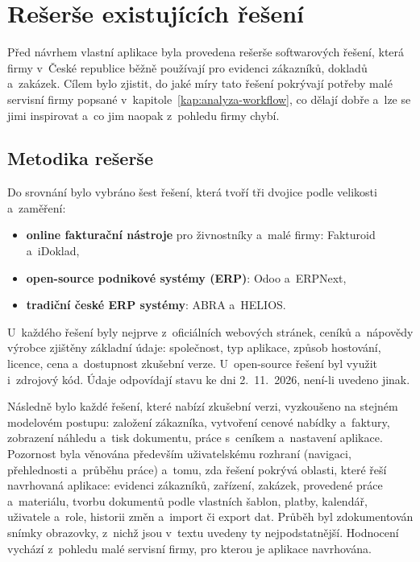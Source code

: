 \chapter{Rešerše existujících řešení}\label{kap:reserse}

Před návrhem vlastní aplikace byla provedena rešerše softwarových řešení, která firmy v~České republice běžně používají pro evidenci zákazníků, dokladů a~zakázek. Cílem bylo zjistit, do jaké míry tato řešení pokrývají potřeby malé servisní firmy popsané v~kapitole~\ref{kap:analyza-workflow}, co dělají dobře a~lze se jimi inspirovat a~co jim naopak z~pohledu firmy chybí.

\section{Metodika rešerše}\label{sec:reserse-metodika}

Do srovnání bylo vybráno šest řešení, která tvoří tři dvojice podle velikosti a~zaměření:
\begin{itemize}
\item \textbf{online fakturační nástroje} pro živnostníky a~malé firmy: Fakturoid a~iDoklad,
\item \textbf{open-source podnikové systémy (ERP)}: Odoo a~ERPNext,
\item \textbf{tradiční české ERP systémy}: ABRA a~HELIOS.
\end{itemize}

U~každého řešení byly nejprve z~oficiálních webových stránek, ceníků a~nápovědy výrobce zjištěny základní údaje: společnost, typ aplikace, způsob hostování, licence, cena a~dostupnost zkušební verze. U~open-source řešení byl využit i~zdrojový kód. Údaje odpovídají stavu ke dni 2.~11.~2026, není-li uvedeno jinak.

Následně bylo každé řešení, které nabízí zkušební verzi, vyzkoušeno na stejném modelovém postupu: založení zákazníka, vytvoření cenové nabídky a~faktury, zobrazení náhledu a~tisk dokumentu, práce s~ceníkem a~nastavení aplikace. Pozornost byla věnována především uživatelskému rozhraní (navigaci, přehlednosti a~průběhu práce) a~tomu, zda řešení pokrývá oblasti, které řeší navrhovaná aplikace: evidenci zákazníků, zařízení, zakázek, provedené práce a~materiálu, tvorbu dokumentů podle vlastních šablon, platby, kalendář, uživatele a~role, historii změn a~import či export dat. Průběh byl zdokumentován snímky obrazovky, z~nichž jsou v~textu uvedeny ty nejpodstatnější. Hodnocení vychází z~pohledu malé servisní firmy, pro kterou je aplikace navrhována.

